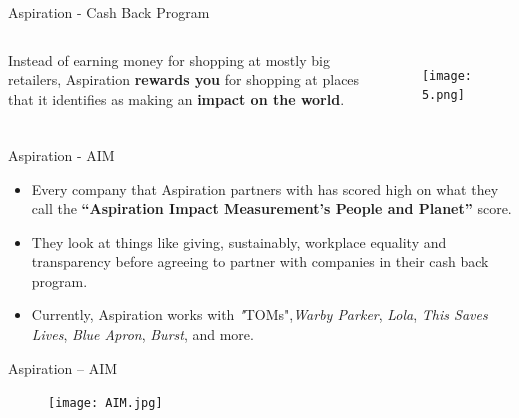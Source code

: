 \documentclass{beamer}
\begin{document}
\begin{frame}{Aspiration - Cash Back Program}
\begin{columns}
 
\begin{itemize}
  \centering Instead of earning money for shopping at mostly big retailers, Aspiration \textbf{rewards you} for shopping at places that it identifies as making an \textbf{impact on the world}. 
\end{itemize}

\begin{figure}[ht]
\begin{right}
\texttt{[image: 5.png]}

\end{right}
\end{figure}
\end{columns}

\end{frame}





\begin{frame}{Aspiration - AIM}
\begin{itemize}
  
\item Every company that Aspiration partners with has scored high on what they call the \textbf{“Aspiration Impact Measurement’s People and Planet”} score.
\item They look at things like giving, sustainably, workplace equality and transparency before agreeing to partner with companies in their cash back program. 
\item Currently, Aspiration works with \emph"{TOMs}",\emph{Warby Parker}, \emph{Lola}, \emph{This Saves Lives}, \emph{Blue Apron}, \emph {Burst}, and more.
\end{itemize}
\end{frame}

\begin{frame}{Aspiration -- AIM }
    

  

    \begin{figure}[htp]
    \centering
    \texttt{[image: AIM.jpg]}
    
\end{figure}



\end{frame}
\end{document}
